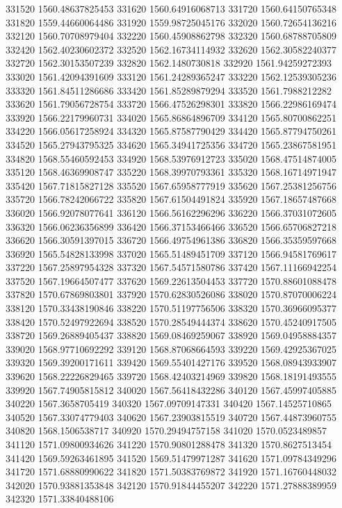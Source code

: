 {331520 1560.48637825453
331620 1560.64916068713
331720 1560.64150765348
331820 1559.44660064486
331920 1559.98725045176
332020 1560.72654136216
332120 1560.70708979404
332220 1560.45908862798
332320 1560.68788705809
332420 1562.40230602372
332520 1562.16734114932
332620 1562.30582240377
332720 1562.30153507239
332820 1562.1480730818
332920 1561.94259272393
333020 1561.42094391609
333120 1561.24289365247
333220 1562.12539305236
333320 1561.84511286686
333420 1561.85289879294
333520 1561.7988212282
333620 1561.79056728754
333720 1566.47526298301
333820 1566.22986169474
333920 1566.22179960731
334020 1565.86864896709
334120 1565.80700862251
334220 1566.05617258924
334320 1565.87587790429
334420 1565.87794750261
334520 1565.27943795325
334620 1565.34941725356
334720 1565.23867581951
334820 1568.55460592453
334920 1568.53976912723
335020 1568.47514874005
335120 1568.46369908747
335220 1568.39970793361
335320 1568.16714971947
335420 1567.71815827128
335520 1567.65958777919
335620 1567.25381256756
335720 1566.78242066722
335820 1567.61504491824
335920 1567.18657487668
336020 1566.92078077641
336120 1566.56162296296
336220 1566.37031072605
336320 1566.06236356899
336420 1566.37153466466
336520 1566.65706827218
336620 1566.30591397015
336720 1566.49754961386
336820 1566.35359597668
336920 1565.54828133998
337020 1565.51489451709
337120 1566.94581769617
337220 1567.25897954328
337320 1567.54571580786
337420 1567.11166942254
337520 1567.19664507477
337620 1569.22613504453
337720 1570.88601088478
337820 1570.67869803801
337920 1570.62830526086
338020 1570.87070006224
338120 1570.33438190846
338220 1570.51197756506
338320 1570.36966095377
338420 1570.52497922694
338520 1570.28549444374
338620 1570.45240917505
338720 1569.26889405437
338820 1569.08469259067
338920 1569.04958884357
339020 1568.97710692292
339120 1568.87068664593
339220 1569.42925367025
339320 1569.39200171611
339420 1569.55401427176
339520 1568.08943933907
339620 1568.22226829465
339720 1568.42403214969
339820 1568.18191493555
339920 1567.74905815812
340020 1567.56418432286
340120 1567.45997405885
340220 1567.3658705419
340320 1567.09709147331
340420 1567.14525710865
340520 1567.33074779403
340620 1567.23903815519
340720 1567.44873960755
340820 1568.1506538717
340920 1570.29494757158
341020 1570.0523489857
341120 1571.09800934626
341220 1570.90801288478
341320 1570.8627513454
341420 1569.59263461895
341520 1569.51479971287
341620 1571.09784349296
341720 1571.68880990622
341820 1571.50383769872
341920 1571.16760448032
342020 1570.93881353848
342120 1570.91844455207
342220 1571.27888389959
342320 1571.33840488106
}
